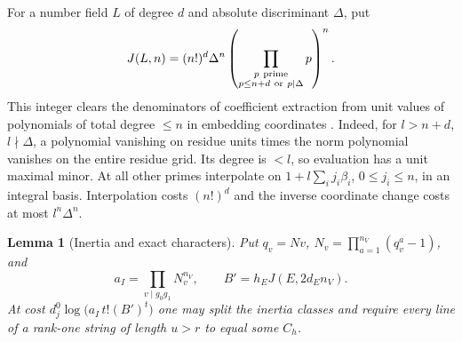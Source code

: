 \theoremstyle{plain}
\newtheorem{twistedtest}{Lemma}[theorem]
\renewcommand{\thetwistedtest}{\thetheorem\alph{twistedtest}}

For a number field $L$ of degree $d$ and absolute discriminant
$\Delta$, put
\[
 J(L,n)=(n!)^d\Delta^n
 \left(\prod_{\substack{p\ {\rm prime}\\p\le n+d\ {\rm or}\ p\mid\Delta}}p\right)^n .
\]
This integer clears the denominators of coefficient extraction from unit
values of polynomials of total degree $\le n$ in embedding coordinates
\citep[section on integral coefficient extraction]{nongenerator-note}.
Indeed, for $l>n+d$, $l\nmid\Delta$, a polynomial vanishing on residue
units times the norm polynomial vanishes on the entire residue grid.
Its degree is $<l$, so evaluation has a unit maximal minor. At all other
primes interpolate on $1+l\sum_i j_i\beta_i$, $0\le j_i\le n$, in
an integral basis. Interpolation costs $(n!)^d$ and the inverse
coordinate change costs at most $l^n\Delta^n$.

\begin{twistedtest}[Inertia and exact characters]\label{lem:twisted-exact}
Put $q_v=Nv$, $N_v=\prod_{a=1}^{n_V}(q_v^a-1)$, and
\[
 a_I=\prod_{v\mid g_0g_1}N_v^{n_V},\qquad
 B'=h_EJ(E,2d_E n_V).
\]
At cost $d_j^0\log\bigl(a_I\,t!(B')^t\bigr)$ one may split the
inertia classes and require every line of a rank-one string of length
$u>r$ to equal some $C_h$.
\end{twistedtest}

